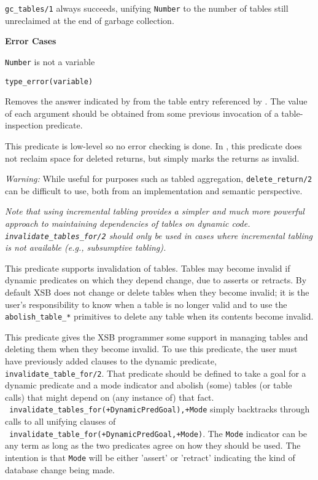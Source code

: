 \begin{description}
\begin{description}
{\tt gc\_tables/1} always succeeds,  unifying {\tt Number}
to the number of tables still unreclaimed at the end of garbage
collection.

{\bf Error Cases}
\bi
\item {\tt Number} is not a variable
\bi
\item 	{\tt type\_error(variable)}
\ei
\ei


%
Removes the answer indicated by  from the table
entry referenced by .  The value of each
argument should be obtained from some previous invocation of a
table-inspection predicate.

This predicate is low-level so no error checking is done.  In \version
, this predicate does not reclaim space for deleted returns, but
simply marks the returns as invalid.

{\em Warning: } While useful for purposes such as tabled aggregation,
{\tt delete\_return/2} can be difficult to use, both from an
implementation and semantic perspective.  

%
{\em Note that using incremental tabling provides a simpler and much
  more powerful approach to maintaining dependencies of tables on
  dynamic code.  {\tt invalidate\_tables\_for/2} should only be used
  in cases where incremental tabling is not available (e.g.,
  subsumptive tabling).}

This predicate supports invalidation of tables.  Tables may become
invalid if dynamic predicates on which they depend change, due to
asserts or retracts.  By default XSB does not change or delete tables
when they become invalid; it is the user's responsibility to know when
a table is no longer valid and to use the {\tt abolish\_table\_*}
primitives to delete any table when its contents become invalid.

This predicate gives the XSB programmer some support in managing
tables and deleting them when they become invalid.  To use this
predicate, the user must have previously added clauses to the dynamic
predicate, {\tt invalidate\_table\_for/2}.  That predicate should be
defined to take a goal for a dynamic predicate and a mode indicator
and abolish (some) tables (or table calls) that might depend on (any
instance of) that fact.  \\ {\tt
invalidate\_tables\_for(+DynamicPredGoal),+Mode} simply backtracks
through calls to all unifying clauses of \\ {\tt
invalidate\_table\_for(+DynamicPredGoal,+Mode)}.  The {\tt Mode}
indicator can be any term as long as the two predicates agree on how
they should be used.  The intention is that {\tt Mode} will be either
'assert' or 'retract' indicating the kind of database change being
made.


\end{description}
\end{description}
